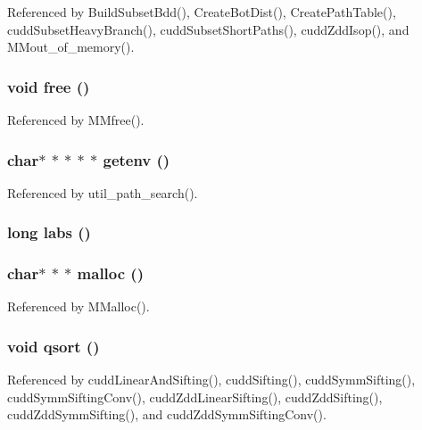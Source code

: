 Referenced by Build\-Subset\-Bdd(), Create\-Bot\-Dist(), Create\-Path\-Table(), cudd\-Subset\-Heavy\-Branch(), cudd\-Subset\-Short\-Paths(), cudd\-Zdd\-Isop(), and MMout\_\-of\_\-memory().
\subsubsection{\setlength{\rightskip}{0pt plus 5cm}void free ()}\label{util-std_8h_afde19f7d36ca163a143579c1b125b6d}




Referenced by MMfree().
\subsubsection{\setlength{\rightskip}{0pt plus 5cm}char$\ast$ $\ast$ $\ast$ $\ast$ $\ast$ getenv ()}\label{util-std_8h_cb7aac2d59056b3da9731787ed865586}




Referenced by util\_\-path\_\-search().
\subsubsection{\setlength{\rightskip}{0pt plus 5cm}long labs ()}\label{util-std_8h_d91d1d63f7057fbcaf8906a83b54380f}


\subsubsection{\setlength{\rightskip}{0pt plus 5cm}char$\ast$ $\ast$ $\ast$ malloc ()}\label{util-std_8h_a9627589b4e1c8d29ee6377dae75e8f0}




Referenced by MMalloc().
\subsubsection{\setlength{\rightskip}{0pt plus 5cm}void qsort ()}\label{util-std_8h_3ab230aa1fbe4b7e1694e678ed275af1}




Referenced by cudd\-Linear\-And\-Sifting(), cudd\-Sifting(), cudd\-Symm\-Sifting(), cudd\-Symm\-Sifting\-Conv(), cudd\-Zdd\-Linear\-Sifting(), cudd\-Zdd\-Sifting(), cudd\-Zdd\-Symm\-Sifting(), and cudd\-Zdd\-Symm\-Sifting\-Conv().
